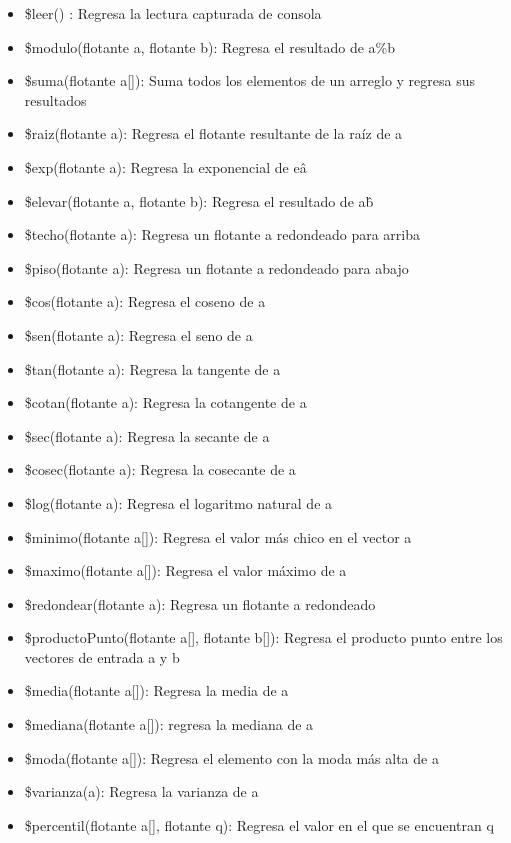 \begin{itemize}
    \item \$leer() : Regresa la lectura capturada de consola
    \item \$modulo(flotante a, flotante b): Regresa el resultado de a\%b
    \item \$suma(flotante a[]): Suma todos los elementos de un arreglo y regresa sus resultados
    \item \$raiz(flotante a): Regresa el flotante resultante de la raíz de a
    \item \$exp(flotante a): Regresa la exponencial de e\^a
    \item \$elevar(flotante a, flotante b): Regresa el resultado de a\^b
    \item \$techo(flotante a): Regresa un flotante a redondeado para arriba
    \item \$piso(flotante a): Regresa un flotante a redondeado para abajo
    \item \$cos(flotante a): Regresa el coseno de a
    \item \$sen(flotante a): Regresa el seno de a
    \item \$tan(flotante a): Regresa la tangente de a
    \item \$cotan(flotante a): Regresa la cotangente de a
    \item \$sec(flotante a): Regresa la secante de a
    \item \$cosec(flotante a): Regresa la cosecante de a
    \item \$log(flotante a): Regresa el logaritmo natural de a
    \item \$minimo(flotante a[]): Regresa el valor más chico en el vector a
    \item \$maximo(flotante a[]): Regresa el valor máximo de a
    \item \$redondear(flotante a): Regresa un flotante a redondeado 
    \item \$productoPunto(flotante a[], flotante b[]): Regresa el producto punto entre los vectores de entrada a y b
    \item \$media(flotante a[]): Regresa la media de a
    \item \$mediana(flotante a[]): regresa la mediana de a
    \item \$moda(flotante a[]): Regresa el elemento con la moda más alta de a
    \item \$varianza(a): Regresa la varianza de a
    \item \$percentil(flotante a[], flotante q): Regresa el valor en el que se encuentran q%

\end{itemize}
